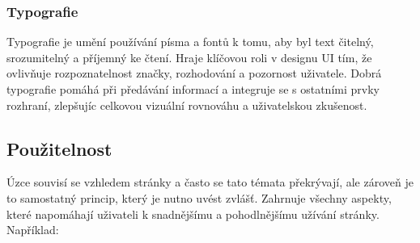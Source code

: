 \subsubsection{Typografie}
Typografie je umění používání písma a fontů k tomu, aby byl text čitelný, srozumitelný a příjemný ke čtení. Hraje klíčovou roli v designu UI tím, že ovlivňuje rozpoznatelnost značky, rozhodování a pozornost uživatele. Dobrá typografie pomáhá při předávání informací a integruje se s ostatními prvky rozhraní, zlepšujíc celkovou vizuální rovnováhu a uživatelskou zkušenost.

\subsection{Použitelnost}
Úzce souvisí se vzhledem stránky a často se tato témata překrývají, ale zároveň je to samostatný princip, který je nutno uvést zvlášť. Zahrnuje všechny aspekty, které napomáhají uživateli k snadnějšímu a pohodlnějšímu užívání stránky. Například:

